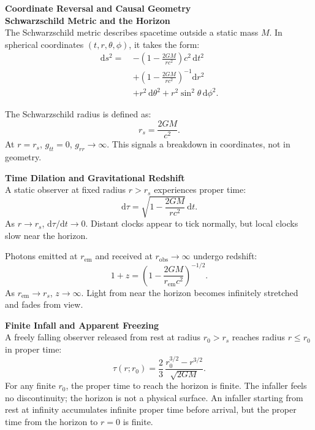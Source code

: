 \begin{technical}
{\Large\textbf{Coordinate Reversal and Causal Geometry}}\\[0.1em]

\noindent\textbf{Schwarzschild Metric and the Horizon}\\[0.5em]
The Schwarzschild metric describes spacetime outside a static mass \(M\). In spherical coordinates \((t, r, \theta, \phi)\), it takes the form:
\begin{align*}
\mathrm{d}s^2 =\ 
& -\left(1 - \frac{2GM}{rc^2}\right)c^2\,\mathrm{d}t^2 \nonumber \\
& + \left(1 - \frac{2GM}{rc^2}\right)^{-1}\mathrm{d}r^2 \nonumber \\
& + r^2\,\mathrm{d}\theta^2 + r^2\sin^2\theta\,\mathrm{d}\phi^2.
\end{align*}

The Schwarzschild radius is defined as:
\[
r_s = \frac{2GM}{c^2}.
\]
At \(r = r_s\), \(g_{tt} = 0\), \(g_{rr} \to \infty\). This signals a breakdown in coordinates, not in geometry.

\vspace{0.3em}
\noindent\textbf{Time Dilation and Gravitational Redshift}\\[0.5em]
A static observer at fixed radius \(r > r_s\) experiences proper time:
\begin{equation}
\mathrm{d}\tau = \sqrt{1 - \frac{2GM}{rc^2}}\,\mathrm{d}t.
\end{equation}
As \(r \to r_s\), \(\mathrm{d}\tau/\mathrm{d}t \to 0\). Distant clocks appear to tick normally, but local clocks slow near the horizon.

Photons emitted at \(r_{\text{em}}\) and received at \(r_{\text{obs}} \to \infty\) undergo redshift:
\begin{equation}
1 + z = \left(1 - \frac{2GM}{r_{\text{em}}c^2}\right)^{-1/2}.
\end{equation}
As \(r_{\text{em}} \to r_s\), \(z \to \infty\). Light from near the horizon becomes infinitely stretched and fades from view.

\vspace{0.3em}
\noindent\textbf{Finite Infall and Apparent Freezing}\\[0.5em]
A freely falling observer released from rest at radius \(r_0 > r_s\) reaches radius \(r \le r_0\) in proper time:
\begin{equation}
\tau(r; r_0) = \frac{2}{3}\,\frac{r_0^{3/2} - r^{3/2}}{\sqrt{2GM}}.
\end{equation}
For any finite \(r_0\), the proper time to reach the horizon is finite. The infaller feels no discontinuity; the horizon is not a physical surface. An infaller starting from rest at infinity accumulates infinite proper time before arrival, but the proper time from the horizon to \(r=0\) is finite.


\end{technical}
